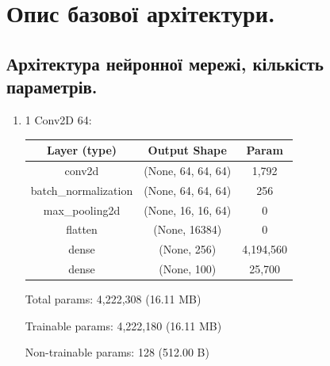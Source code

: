 \documentclass{article}
\begin{document}
    \section{Опис базової архітектури.}
    \subsection{Архітектура нейронної мережі, кількість параметрів.}
    \begin{enumerate}
        \item 1 Conv2D 64:
            \begin{table}[h!]
                \begin{tabular}{| c | c | c |}
                    \hline
                    Layer (type) & Output Shape & Param \\
                    \hline
                    conv2d & (None, 64, 64, 64) & 1,792 \\
                    \hline
                    batch\_normalization & (None, 64, 64, 64) & 256 \\
                    \hline
                    max\_pooling2d & (None, 16, 16, 64) & 0 \\
                    \hline
                    flatten & (None, 16384) & 0 \\
                    \hline
                    dense & (None, 256) &  4,194,560 \\
                    \hline
                    dense & (None, 100) &  25,700 \\
                    \hline
                \end{tabular}
            \end{table}

            Total params: 4,222,308 (16.11 MB)

            Trainable params: 4,222,180 (16.11 MB)

            Non-trainable params: 128 (512.00 B)
        

\end{enumerate}
\end{document}
